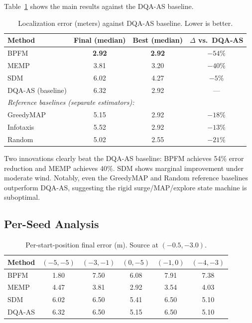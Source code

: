 \documentclass[conference]{IEEEtran}
\begin{document}
Table~\ref{tab:main} shows the main results against the DQA-AS baseline.

\begin{table}[h]
\centering
\caption{Localization error (meters) against DQA-AS baseline. Lower is better.}
\label{tab:main}
\begin{tabular}{lccc}
\toprule
Method & Final (median) & Best (median) & $\Delta$ vs.\ DQA-AS \\
\midrule
BPFM & \textbf{2.92} & \textbf{2.92} & \textbf{$-54\%$} \\
MEMP & 3.81 & 3.20 & $-40\%$ \\
SDM  & 6.02 & 4.27 & $-5\%$ \\
DQA-AS (baseline) & 6.32 & 2.92 & --- \\
\midrule
\multicolumn{4}{l}{\textit{Reference baselines (separate estimators):}} \\
GreedyMAP & 5.15 & 2.92 & $-18\%$ \\
Infotaxis & 5.52 & 2.92 & $-13\%$ \\
Random    & 5.02 & 2.55 & $-21\%$ \\
\bottomrule
\end{tabular}
\end{table}

Two innovations clearly beat the DQA-AS baseline: BPFM achieves 54\% error reduction and MEMP achieves 40\%.
SDM shows marginal improvement under moderate wind.
Notably, even the GreedyMAP and Random reference baselines outperform DQA-AS, suggesting the rigid surge/MAP/explore state machine is suboptimal.

\subsection{Per-Seed Analysis}

\begin{table}[h]
\centering
\caption{Per-start-position final error (m). Source at $(-0.5, -3.0)$.}
\label{tab:perseed}
\begin{tabular}{lccccc}
\toprule
Method & $(-5,-5)$ & $(-3,-1)$ & $(0,-5)$ & $(-1,0)$ & $(-4,-3)$ \\
\midrule
BPFM   & 1.80 & 7.50 & 6.08 & 7.91 & 7.38 \\
MEMP   & 4.47 & 3.81 & 2.92 & 3.54 & 4.03 \\
SDM    & 6.02 & 6.50 & 5.41 & 6.50 & 5.10 \\
DQA-AS & 6.32 & 6.50 & 5.15 & 6.50 & 5.10 \\
\bottomrule
\end{tabular}
\end{table}
\end{document}

